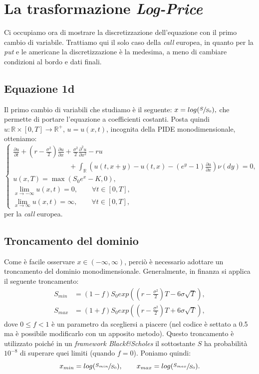 \documentclass[a4paper,10pt]{report}
\newcommand{\der}[2]{\frac{\partial #1}{\partial #2}}
\newcommand{\dder}[2]{\frac{\partial^2 #1}{\partial #2^2}}
\theoremstyle{plain}
\theoremstyle{definition}
\theoremstyle{remark}
\begin{document}
\section{La trasformazione \emph{Log-Price}}
Ci occupiamo ora di mostrare la discretizzazione dell'equazione con il primo cambio di variabile. Trattiamo qui il solo caso della \emph{call} europea, in quanto per la \emph{put} e le americane la discretizzazione \`e la medesima, a meno di cambiare condizioni al bordo e dati finali.
\subsection{Equazione 1d}
Il primo cambio di variabili che studiamo \`e il seguente: $x=log(\sfrac{S}{S_0}),$ che permette di portare l'equazione a coefficienti costanti. Posta quindi $u: \mathbb{R}\times[0,T]\rightarrow\mathbb{R}^+$, $u=u(x,t)$, incognita della PIDE monodimensionale, otteniamo:
\begin{equation}
\label{eq:pide1dlog}
\begin{cases}
\displaystyle
\der{u}{t}+\left(r-\frac{\sigma^2}{2}\right)\der{u}{x}+\frac{\sigma^2}{2}\dder{u}{x}-ru\\
\displaystyle
\qquad\qquad\qquad\qquad+\int_\mathbb{R}\left( u(t,x+y)-u(t,x)-(e^y-1)\der{u}{x}\right)\nu(dy)=0,\\
u(x,T)=\max(S_0e^x-K,0),\\
\lim\limits_{x\to-\infty}u(x,t)=0,\qquad\forall t\in[0,T],\\
\lim\limits_{x\to\infty}u(x,t)=\infty,\qquad\forall t\in[0,T],
\end{cases}
\end{equation}
per la \emph{call} europea.
\subsection{Troncamento del dominio}
Come \`e facile osservare $x\in(-\infty,\infty)$, perci\`o \`e necessario adottare un troncamento del dominio monodimensionale. Generalmente, in finanza si applica il seguente troncamento:
\begin{align}
\label{cut}
S_{min}&=(1-f)S_0exp\left( \left(r-\frac{\sigma^2}{2}\right)T-6\sigma\sqrt{T}\right),\\
S_{max}&=(1+f)S_0exp\left( \left(r-\frac{\sigma^2}{2}\right)T+6\sigma\sqrt{T}\right), \nonumber
\end{align}
dove $0\leq f<1$ \`e un parametro da scegliersi a piacere (nel codice \`e settato a 0.5 ma \`e possibile modificarlo con un apposito metodo). Questo troncamento \`e utilizzato poich\'e in un \emph{framework Black\&Scholes} il sottostante $S$ ha probabilit\`a $10^{-8}$ di superare quei limiti (quando $f=0$). Poniamo quindi: $$x_{min}=log(\sfrac{S_{min}}{S_0}), \qquad x_{max}=log(\sfrac{S_{max}}{S_0}).$$
\end{document}

